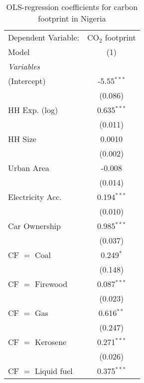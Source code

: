 
\begin{table}[htbp!]
   \centering
   \small
   \begin{adjustbox}{width = 1\textwidth, max height = 0.95\textheight, center}
      \begin{threeparttable}[b]
         \caption{\label{tab:OLS_2_NGA} OLS-regression coefficients for carbon footprint in Nigeria}
         \begin{tabular}{lc}
            \tabularnewline \midrule \midrule
            Dependent Variable: & CO$_{2}$ footprint\\  
            Model               & (1)\\  
            \midrule
            \emph{Variables}\\
            (Intercept)         & -5.55$^{***}$\\   
                                & (0.086)\\   
            HH Exp. (log)       & 0.635$^{***}$\\   
                                & (0.011)\\   
            HH Size             & 0.0010\\   
                                & (0.002)\\   
            Urban Area          & -0.008\\   
                                & (0.014)\\   
            Electricity Acc.    & 0.194$^{***}$\\   
                                & (0.010)\\   
            Car Ownership       & 0.985$^{***}$\\   
                                & (0.037)\\   
            CF $=$ Coal         & 0.249$^{*}$\\   
                                & (0.148)\\   
            CF $=$ Firewood     & 0.087$^{***}$\\   
                                & (0.023)\\   
            CF $=$ Gas          & 0.616$^{**}$\\   
                                & (0.247)\\   
            CF $=$ Kerosene     & 0.271$^{***}$\\   
                                & (0.026)\\   
            CF $=$ Liquid fuel  & 0.375$^{***}$\\   

\end{tabular}
\end{threeparttable}
\end{adjustbox}
\end{table}
